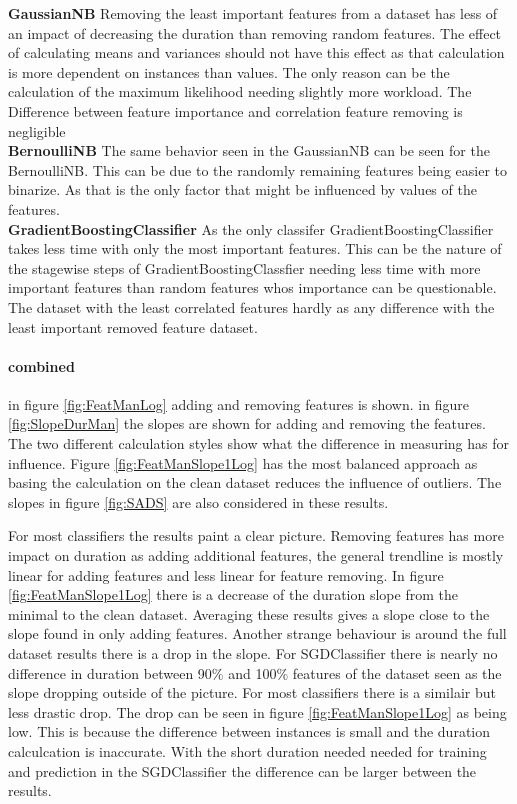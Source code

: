 \documentclass[a4paper,10pt]{article}
\begin{document}
\textbf{GaussianNB} Removing the least important features from a dataset has less of an impact of decreasing the duration than removing random features. The effect of calculating means and variances should not have this effect as that calculation is more dependent on instances than values. The only reason can be the calculation of the maximum likelihood needing slightly more workload. The Difference between feature importance and correlation feature removing is negligible \\

\textbf{BernoulliNB} The same behavior seen in the GaussianNB can be seen for the BernoulliNB. This can be due to the randomly remaining features being easier to binarize. As that is the only factor that might be influenced by values of the features. \\

\textbf{GradientBoostingClassifier} As the only classifer GradientBoostingClassifier takes less time with only the most important features. This can be the nature of the stagewise steps of GradientBoostingClassfier needing less time with more important features than random features whos importance can be questionable. The dataset with the least correlated features hardly as any difference with the least important removed feature dataset.\\


\paragraph{combined}
in figure \ref{fig:FeatManLog} adding and removing features is shown.
in figure \ref{fig:SlopeDurMan} the slopes are shown for adding and removing the features. The two different calculation styles show what the difference in measuring has for influence. Figure \ref{fig:FeatManSlope1Log} has the most balanced approach as basing the calculation on the clean dataset reduces the influence of outliers. The slopes in figure \ref{fig:SADS} are also considered in these results.

For most classifiers the results paint a clear picture. Removing features has more impact on duration as adding additional features, the general trendline is mostly linear for adding features and less linear for feature removing. In figure \ref{fig:FeatManSlope1Log} there is a decrease of the duration slope from the minimal to the clean dataset. Averaging these results gives a slope close to the slope found in only adding features. Another strange behaviour is around the full dataset results there is a drop in the slope. For SGDClassifier there is nearly no difference in duration between 90$\%$ and 100$\%$ features of the dataset seen as the slope dropping outside of the picture. For most classifiers there is a similair but less drastic drop. The drop can be seen in figure \ref{fig:FeatManSlope1Log} as being low. This is because the difference between instances is small and the duration calculcation is inaccurate. With the short duration needed needed for training and prediction in the SGDClassifier the difference can be larger between the results. 
\end{document}
